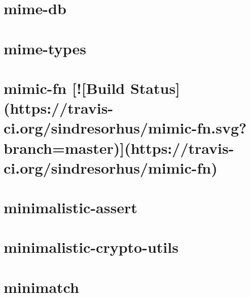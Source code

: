 \documentclass[twoside]{book}
\newcommand{\+}{\discretionary{\mbox{\scriptsize$\hookleftarrow$}}{}{}}
\begin{document}
\chapter{mime-\/db}
\label{md__c_1_workspace_demo_src_main_script_node_modules_mime-types_node_modules_mime-db__r_e_a_d_m_e}

\chapter{mime-\/types}
\label{md__c_1_workspace_demo_src_main_script_node_modules_mime-types__r_e_a_d_m_e}

\chapter{mimic-\/fn \mbox{[}!\mbox{[}Build Status\mbox{]}(https\+://travis-\/ci.org/sindresorhus/mimic-\/fn.svg?branch=master)\mbox{]}(https\+://travis-\/ci.org/sindresorhus/mimic-\/fn)}
\label{md__c_1_workspace_demo_src_main_script_node_modules_mimic-fn_readme}

\chapter{minimalistic-\/assert}
\label{md__c_1_workspace_demo_src_main_script_node_modules_minimalistic-assert_readme}

\chapter{minimalistic-\/crypto-\/utils}
\label{md__c_1_workspace_demo_src_main_script_node_modules_minimalistic-crypto-utils__r_e_a_d_m_e}

\chapter{minimatch}
\label{md__c_1_workspace_demo_src_main_script_node_modules_minimatch__r_e_a_d_m_e}

\end{document}
